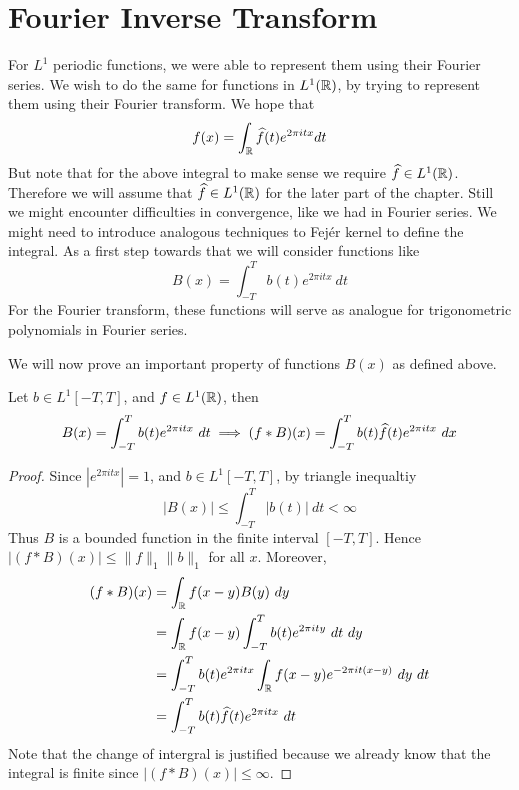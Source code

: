 \section{Fourier Inverse Transform}
For $L^1$ periodic functions, we were able to represent them using their Fourier series. We wish to do the same for functions in $L^1(\mathbb R)$, by trying to represent them using their Fourier transform. We hope that $$f(x) = \int_\mathbb R \widehat{f}(t) e^{2\pi itx} dt$$
But note that for the above integral to make sense we require $\widehat{f} \in L^1(\mathbb R)$. Therefore we will assume that $\widehat{f} \in L^1(\mathbb R)$ for the later part of the chapter. Still we might encounter difficulties in convergence, like we had in Fourier series. We might need to introduce analogous techniques to Fej\'er kernel to define the integral. As a first step towards that we will consider functions like $$B(x) = \int_{-T}^T b(t)e^{2 \pi itx} \ dt$$
For the Fourier transform, these functions will serve as analogue for trigonometric polynomials in Fourier series.

We will now prove an important property of functions $B(x)$ as defined above. 

\begin{proposition}
  \label{prop:property_of_analogue_of_trigonometric_functions}
  Let $b \in L^1[-T, T]$, and $f \in L^1(\mathbb R)$, then $$B(x) = \int_{-T}^T b(t)e^{2\pi itx} \ dt \implies (f*B)(x) = \int_{-T}^T b(t) \widehat{f}(t)e^{2\pi itx} \ dx$$
\end{proposition}
\begin{proof}
  Since $|e^{2 \pi itx}| = 1$, and $b \in L^1[-T, T]$, by triangle inequaltiy $$|B(x)| \le \int_{-T}^T |b(t)| \ dt < \infty$$
  Thus $B$ is a bounded function in the finite interval $[-T, T]$. Hence $|(f*B)(x)| \le \|f\|_1 \|b\|_1$ for all $x$. Moreover, 
  \begin{align*}
    (f*B)(x) &= \int_\mathbb R f(x-y)B(y) \ dy \\
    &= \int_\mathbb R f(x-y) \int_{-T}^T b(t)e^{2 \pi ity} \ dt \ dy \\
    &= \int_{-T}^{T}b(t) e^{2 \pi itx}\int_\mathbb R f(x-y) e^{-2 \pi it(x-y)} \ dy \ dt \\
    &= \int_{-T}^T b(t)\widehat{f}(t)e^{2\pi itx} \ dt
  \end{align*}
  Note that the change of intergral is justified because we already know that the integral is finite since $|(f*B)(x)| \le \infty$.
\end{proof}

